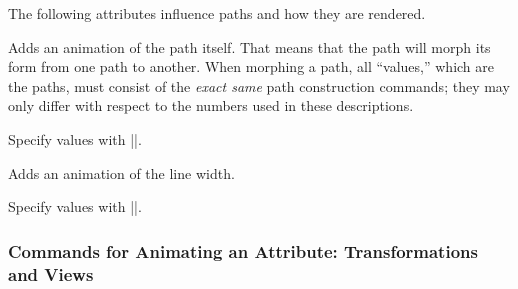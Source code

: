 The following attributes influence paths and how they are rendered.

\begin{command}{\pgfsys@animatepath}
  Adds an animation of the path itself. That means that the path will
  morph its form from one path to another. When morphing a path, all
  ``values,'' which are the paths, must consist of the  \emph{exact
    same} path construction commands; they may only differ with
  respect to the numbers used in these descriptions.
  
  Specify values with |\pgfsys@animation@path|.
\begin{codeexample}[width=2.3cm]
\end{codeexample}
\end{command}

\begin{command}{\pgfsys@animatelinewidth}
  Adds an animation of the line width.
  
  Specify values with |\pgfsys@animation@dimension|.
\begin{codeexample}[width=2cm]
\end{codeexample}
\end{command}


\subsubsection{Commands for Animating an Attribute: Transformations  and Views}

